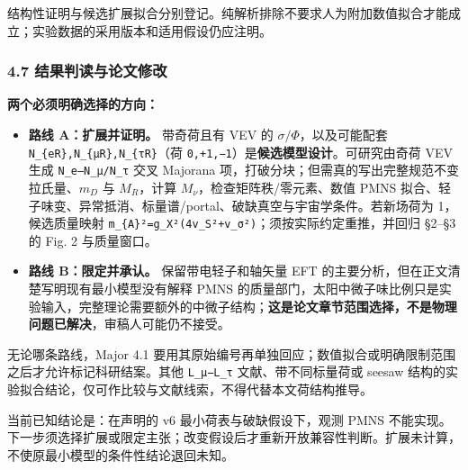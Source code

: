 \documentclass[
]{article}
\providecommand{\tightlist}{%
  \setlength{\itemsep}{0pt}\setlength{\parskip}{0pt}}
\begin{document}
结构性证明与候选扩展拟合分别登记。纯解析排除不要求人为附加数值拟合才能成立；实验数据的采用版本和适用假设仍应注明。

\subsubsection{4.7
结果判读与论文修改}\label{ux7ed3ux679cux5224ux8bfbux4e0eux8bbaux6587ux4feeux6539-2}

\textbf{两个必须明确选择的方向：}

\begin{itemize}
\tightlist
\item
  \textbf{路线 A：扩展并证明。} 带奇荷且有 VEV 的
  \(\sigma/\Phi\)，以及可能配套
  \texttt{N\_\{eR\},N\_\{μR\},N\_\{τR\}}（荷
  \texttt{0,+1,−1}）是\textbf{候选模型设计}。可研究由奇荷 VEV 生成
  \texttt{N\_e–N\_μ/N\_τ} 交叉 Majorana
  项，打破分块；但需真的写出完整规范不变拉氏量、\(m_D\) 与 \(M_R\)，计算
  \(M_\nu\)，检查矩阵秩/零元素、数值 PMNS
  拟合、轻子味变、异常抵消、标量谱/portal、破缺真空与宇宙学条件。若新场荷为
  1，候选质量映射
  \texttt{m\_\{A\textquotesingle{}\}²=g\_X²(4v\_S²+v\_σ²)}；须按实际约定重推，并回归
  §2--§3 的 Fig. 2 与质量窗口。
\item
  \textbf{路线 B：限定并承认。} 保留带电轻子和轴矢量 EFT
  的主要分析，但在正文清楚写明现有最小模型没有解释 PMNS
  的质量部门，太阳中微子味比例只是实验输入，完整理论需要额外的中微子结构；\textbf{这是论文章节范围选择，不是物理问题已解决}，审稿人可能仍不接受。
\end{itemize}

无论哪条路线，Major 4.1
要用其原始编号再单独回应；数值拟合或明确限制范围之后才允许标记科研结案。其他
\texttt{L\_μ−L\_τ} 文献、带不同标量荷或 seesaw
结构的实验拟合结论，仅可作比较与文献线索，不得代替本文荷结构推导。

当前已知结论是：在声明的 v6 最小荷表与破缺假设下，观测 PMNS
不能实现。下一步须选择扩展或限定主张；改变假设后才重新开放兼容性判断。扩展未计算，不使原最小模型的条件性结论退回未知。
\end{document}
